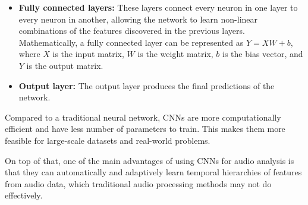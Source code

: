 \begin{itemize}


\item \textbf{Fully connected layers:} These layers connect every neuron in one layer to every neuron in another, allowing the network to learn non-linear combinations of the features discovered in the previous layers. Mathematically, a fully connected layer can be represented as $Y = XW + b$, where $X$ is the input matrix, $W$ is the weight matrix, $b$ is the bias vector, and $Y$ is the output matrix.
\vspace*{3mm}

\item \textbf{Output layer:} The output layer produces the final predictions of the network.

\end{itemize}

Compared to a traditional neural network, CNNs are more computationally efficient and have less number of parameters to train. This makes them more feasible for large-scale datasets and real-world problems.

On top of that, one of the main advantages of using CNNs for audio analysis is that they can automatically and adaptively learn temporal hierarchies of features from audio data, which traditional audio processing methods may not do effectively. 



\newpage


